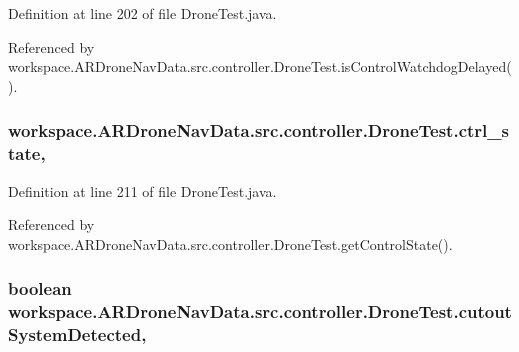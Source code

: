 Definition at line 202 of file Drone\+Test.\+java.



Referenced by workspace.\+A\+R\+Drone\+Nav\+Data.\+src.\+controller.\+Drone\+Test.\+is\+Control\+Watchdog\+Delayed().

\hypertarget{classworkspace_1_1_a_r_drone_nav_data_1_1src_1_1controller_1_1_drone_test_aed0680aaf48f5df307af86a50472dbe8}{}
\subsubsection[{ctrl\+\_\+state}]{ workspace.\+A\+R\+Drone\+Nav\+Data.\+src.\+controller.\+Drone\+Test.\+ctrl\+\_\+state\hspace{0.3cm}{\ttfamily [static]}, {\ttfamily [protected]}}\label{classworkspace_1_1_a_r_drone_nav_data_1_1src_1_1controller_1_1_drone_test_aed0680aaf48f5df307af86a50472dbe8}


Definition at line 211 of file Drone\+Test.\+java.



Referenced by workspace.\+A\+R\+Drone\+Nav\+Data.\+src.\+controller.\+Drone\+Test.\+get\+Control\+State().

\hypertarget{classworkspace_1_1_a_r_drone_nav_data_1_1src_1_1controller_1_1_drone_test_a2607e58169ab089291af5a1d77ae888a}{}
\subsubsection[{cutout\+System\+Detected}]{\setlength{\rightskip}{0pt plus 5cm}boolean workspace.\+A\+R\+Drone\+Nav\+Data.\+src.\+controller.\+Drone\+Test.\+cutout\+System\+Detected\hspace{0.3cm}{\ttfamily [static]}, {\ttfamily [protected]}}\label{classworkspace_1_1_a_r_drone_nav_data_1_1src_1_1controller_1_1_drone_test_a2607e58169ab089291af5a1d77ae888a}


